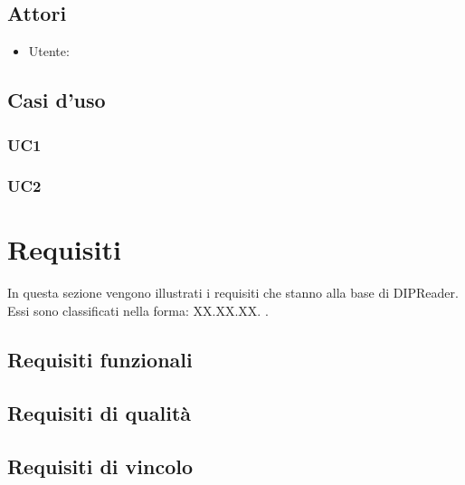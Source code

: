 \documentclass[a4paper,12pt]{article}
\begin{document}
        \subsection{Attori}
            \begin{itemize}
                \item Utente:
            \end{itemize}
        
        \subsection{Casi d'uso}
            \subsubsection{UC1}
            \subsubsection{UC2}

    \section{Requisiti}
            In questa sezione vengono illustrati i requisiti che stanno alla base di DIPReader. Essi sono classificati nella forma: XX.XX.XX. . 
        \subsection{Requisiti funzionali}
        \subsection{Requisiti di qualità}
        \subsection{Requisiti di vincolo}
\end{document}
